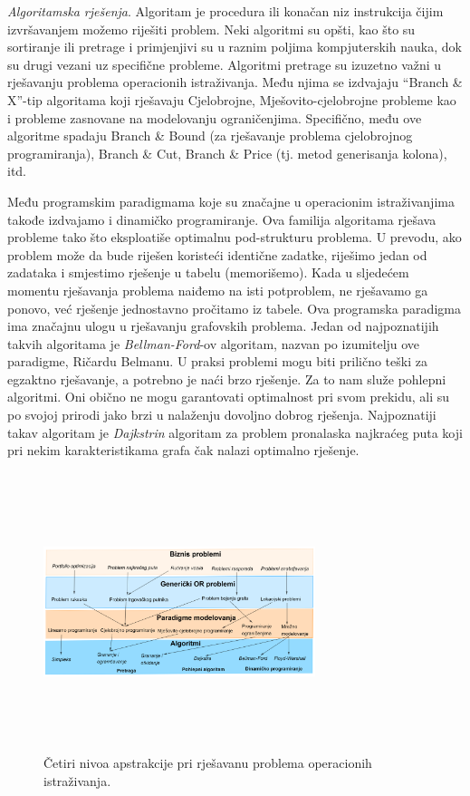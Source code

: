 \documentclass[a4paper, utf8, 11pt, colorlinks]{book}
\begin{document}
\emph{Algoritamska rješenja}. Algoritam je procedura ili konačan niz instrukcija čijim izvršavanjem možemo riješiti problem. Neki algoritmi su opšti, kao što su sortiranje ili pretrage i primjenjivi su u raznim poljima kompjuterskih nauka, dok su drugi vezani uz specifične probleme. Algoritmi pretrage su izuzetno važni u rješavanju problema operacionih istraživanja. Među njima se izdvajaju ``Branch \& X''-tip algoritama koji rješavaju Cjelobrojne, Mješovito-cjelobrojne probleme kao i probleme zasnovane na modelovanju ograničenjima. Specifično, među ove algoritme spadaju Branch \& Bound (za rješavanje problema cjelobrojnog programiranja), Branch \& Cut, Branch \& Price (tj. metod generisanja kolona), itd.

Među programskim paradigmama koje su značajne u operacionim istraživanjima takođe izdvajamo i dinamičko programiranje. Ova familija algoritama rješava probleme tako što eksploatiše optimalnu pod-strukturu problema. U prevodu, ako problem može da bude riješen koristeći identične zadatke, riješimo jedan od zadataka i smjestimo rješenje u tabelu (memorišemo). Kada u sljedećem momentu   rješavanja problema naiđemo na isti potproblem, ne rješavamo ga ponovo, već rješenje jednostavno pročitamo iz tabele. Ova programska paradigma ima značajnu ulogu u rješavanju grafovskih problema. Jedan od najpoznatijih takvih algoritama je \emph{Bellman-Ford}-ov algoritam, nazvan po izumitelju ove paradigme, Ričardu Belmanu. 
U praksi problemi mogu biti prilično teški za egzaktno rješavanje, a potrebno je naći brzo rješenje. Za to nam služe pohlepni algoritmi. Oni obično ne mogu 
garantovati optimalnost pri svom prekidu, ali su   po svojoj prirodi jako brzi u nalaženju dovoljno dobrog rješenja. Najpoznatiji takav algoritam je \emph{Dajkstrin} algoritam za problem pronalaska najkraćeg puta koji pri nekim karakteristikama grafa čak nalazi optimalno rješenje. 

\begin{figure}
    \centering
    \includegraphics[width=300, height=230pt]{overview.eps}
    \caption{Četiri nivoa apstrakcije pri rješavanu problema operacionih istraživanja.}
    \label{fig:OR_four_levels}
\end{figure}
\end{document}
